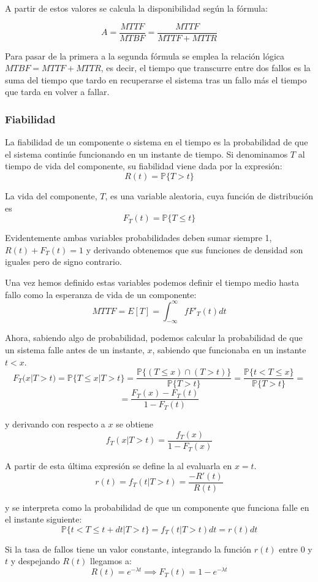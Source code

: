 A partir de estos valores se calcula la disponibilidad según la fórmula:

\[A=\frac{MTTF}{MTBF}=\frac{MTTF}{MTTF+MTTR}\]

Para pasar de la primera a la segunda fórmula se emplea la relación lógica $MTBF=MTTF+MTTR$, es decir, el tiempo que transcurre entre dos fallos es la suma del tiempo que tardo en recuperarse el sistema tras un fallo más el tiempo que tarda en volver a fallar.

\subsubsection{Fiabilidad}

La fiabilidad de un componente o sistema en el tiempo es la probabilidad de que el sistema continúe funcionando en un instante de tiempo. Si denominamos $T$ al tiempo de vida del componente, su fiabilidad viene dada por la expresión:
\[R(t)=\mathbb{P}\{T > t \}\]

La vida del componente, $T$, es una variable aleatoria, cuya función de distribución es
\[F_T(t)=\mathbb{P}\{T \leq t \}\]

Evidentemente ambas variables probabilidades deben sumar siempre 1, $R(t)+F_T(t)=1$ y derivando obtenemos que sus funciones de densidad son iguales pero de signo contrario.

Una vez hemos definido estas variables podemos definir el tiempo medio hasta fallo como la esperanza de vida de un componente:
\[MTTF = E[T]=\int_{-\infty}^{\infty}fF'_T(t)dt\]

Ahora, sabiendo algo de probabilidad, podemos calcular la probabilidad de que un sistema falle antes de un instante, $x$, sabiendo que funcionaba en un instante $t<x$.
\[F_T(x | T > t ) = \mathbb{P}\{T \leq x | T> t\}=\frac{\mathbb{P}\{(T \leq x) \cap (T > t)\}}{\mathbb{P}\{T > t\}}=\frac{\mathbb{P}\{t < T \leq x\}}{\mathbb{P}\{T > t\}}=\]
\[=\frac{F_T(x)-F_T(t)}{1-F_T(t)}\]

y derivando con respecto a $x$ se obtiene
\[f_T(x | T > t)=\frac{f_T(x)}{1-F_T(x)}\]

A partir de esta última expresión se define la  al evaluarla en $x=t$.
\[r(t)=f_T(t | T > t)=\frac{-R'(t)}{R(t)}\]

y se interpreta como la probabilidad de que un componente que funciona falle en el instante siguiente:
\[\mathbb{P}\{t<T\leq t + dt | T > t\}=f_T(t | T > t)dt=r(t)dt\]

Si la tasa de fallos tiene un valor constante, integrando la función $r(t)$ entre $0$ y $t$ y despejando $R(t)$ llegamos a:
\[R(t)=e^{-λt} \implies F_T(t) = 1-e^{-λt}\]


